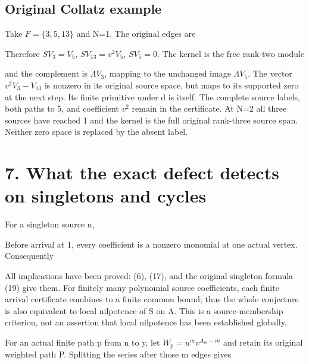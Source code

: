 \subsection{Original Collatz example}

Take \(F=\{3,5,13\}\) and N=1. The original edges are


Therefore \(SV_3=V_5\), \(SV_{13}=v^2V_5\), \(SV_5=0\). The kernel is
the free rank-two module


and the complement is \(\Lambda V_3\), mapping to the unchanged image
\(\Lambda V_5\). The vector \(v^2V_3-V_{13}\) is nonzero in its original
source space, but maps to its supported zero at the next step. Its
finite primitive under d is itself. The complete source labels, both
paths to 5, and coefficient \(v^2\) remain in the certificate. At N=2
all three sources have reached 1 and the kernel is the full original
rank-three source span. Neither zero space is replaced by the absent
label.

\section{7. What the exact defect detects on singletons and cycles}

For a singleton source n,


Before arrival at 1, every coefficient is a nonzero monomial at one
actual vertex. Consequently


All implications have been proved: (6), (17), and the original singleton
formula (19) give them. For finitely many polynomial source
coefficients, each finite arrival certificate combines to a finite
common bound; thus the whole conjecture is also equivalent to local
nilpotence of S on A. This is a source-membership criterion, not an
assertion that local nilpotence has been established globally.

For an actual finite path p from n to y, let \(W_p=u^m v^{A_m-m}\) and
retain its original weighted path P. Splitting the series after those m
edges gives

